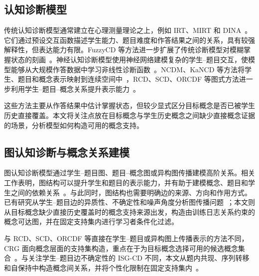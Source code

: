 \documentclass[conference]{IEEEtran}
\begin{document}
\subsection{认知诊断模型}
传统认知诊断模型通常建立在心理测量理论之上，例如 IRT、MIRT 和 DINA~\cite{lord1980irt,reckase2009mirt,delatorre2009dina,templin2006cdm}。它们通过预设交互函数描述学生能力、题目难度和作答结果之间的关系，具有较强解释性，但表达能力有限。FuzzyCD 等方法进一步扩展了传统诊断模型对模糊掌握状态的刻画~\cite{liu2018fuzzycd}。神经认知诊断模型使用神经网络建模复杂的学生--题目交互，使模型能够从大规模作答数据中学习非线性诊断函数~\cite{wang2020ncdm}。NCDM、KaNCD 等方法将学生、题目和概念表示映射到连续空间中~\cite{wang2020ncdm,wang2022kscd}，RCD、SCD、ORCDF 等图式方法进一步利用学生--题目--概念关系提升表示能力~\cite{gao2021rcd,wang2023scd,qian2024orcdf}。

这些方法主要从作答结果中估计掌握状态，但较少显式区分目标概念是否已被学生历史直接覆盖。本文将关注点放在目标概念与学生历史概念之间缺少直接概念证据的场景，分析模型如何构造可用的概念支持。

\subsection{图认知诊断与概念关系建模}
图认知诊断模型通过学生--题目图、题目--概念图或异构图传播建模高阶关系。相关工作表明，图结构可以提升学生和题目的表示能力，并有助于建模概念、题目和学生之间的依赖关系~\cite{kipf2017gcn,velickovic2018gat,hamilton2017graphsage,he2020lightgcn,su2022gcdm}。与此同时，图结构也需要明确边的来源、方向和作用方式。已有研究从学生--题目边的异质性、不确定性和噪声角度分析图传播问题~\cite{wang2024uncertaintycd,shao2025isgcd,zhang2026ncdla}；本文则从目标概念缺少直接历史覆盖时的概念支持来源出发，构造由训练日志关系约束的概念可达图，并在固定支持集内进行学习者条件化过滤。

与 RCD、SCD、ORCDF 等直接在学生--题目或异构图上传播表示的方法不同，CRG 面向概念层面的支持集构造，重点在于为目标概念选择可用的候选概念集合~\cite{gao2021rcd,wang2023scd,qian2024orcdf}。与关注学生--题目边不确定性的 ISG-CD 不同，本文从题内共现、序列转移和自保持中构造概念间关系，并将个性化限制在固定支持集内~\cite{shao2025isgcd}。
\end{document}
